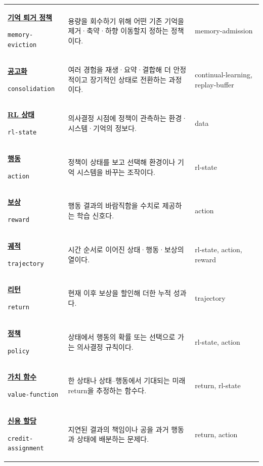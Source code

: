\begin{longtable}{p{} p{} p{}}
\hypertarget{glossary:memory-eviction}{\hyperref[bg:memory-eviction]{\textbf{기억 퇴거 정책}}} \newline\texttt{memory-eviction} & 용량을 회수하기 위해 어떤 기존 기억을 제거·축약·하향 이동할지 정하는 정책이다. & \scriptsize memory-admission \\
\hypertarget{glossary:consolidation}{\hyperref[bg:consolidation]{\textbf{공고화}}} \newline\texttt{consolidation} & 여러 경험을 재생·요약·결합해 더 안정적이고 장기적인 상태로 전환하는 과정이다. & \scriptsize continual-learning, replay-buffer \\
\hypertarget{glossary:rl-state}{\hyperref[bg:rl-state]{\textbf{RL 상태}}} \newline\texttt{rl-state} & 의사결정 시점에 정책이 관측하는 환경·시스템·기억의 정보다. & \scriptsize data \\
\hypertarget{glossary:action}{\hyperref[bg:action]{\textbf{행동}}} \newline\texttt{action} & 정책이 상태를 보고 선택해 환경이나 기억 시스템을 바꾸는 조작이다. & \scriptsize rl-state \\
\hypertarget{glossary:reward}{\hyperref[bg:reward]{\textbf{보상}}} \newline\texttt{reward} & 행동 결과의 바람직함을 수치로 제공하는 학습 신호다. & \scriptsize action \\
\hypertarget{glossary:trajectory}{\hyperref[bg:trajectory]{\textbf{궤적}}} \newline\texttt{trajectory} & 시간 순서로 이어진 상태·행동·보상의 열이다. & \scriptsize rl-state, action, reward \\
\hypertarget{glossary:return}{\hyperref[bg:return]{\textbf{리턴}}} \newline\texttt{return} & 현재 이후 보상을 할인해 더한 누적 성과다. & \scriptsize trajectory \\
\hypertarget{glossary:policy}{\hyperref[bg:policy]{\textbf{정책}}} \newline\texttt{policy} & 상태에서 행동의 확률 또는 선택으로 가는 의사결정 규칙이다. & \scriptsize rl-state, action \\
\hypertarget{glossary:value-function}{\hyperref[bg:value-function]{\textbf{가치 함수}}} \newline\texttt{value-function} & 한 상태나 상태–행동에서 기대되는 미래 return을 추정하는 함수다. & \scriptsize return, rl-state \\
\hypertarget{glossary:credit-assignment}{\hyperref[bg:credit-assignment]{\textbf{신용 할당}}} \newline\texttt{credit-assignment} & 지연된 결과의 책임이나 공을 과거 행동과 상태에 배분하는 문제다. & \scriptsize return, action \\

\end{longtable}
